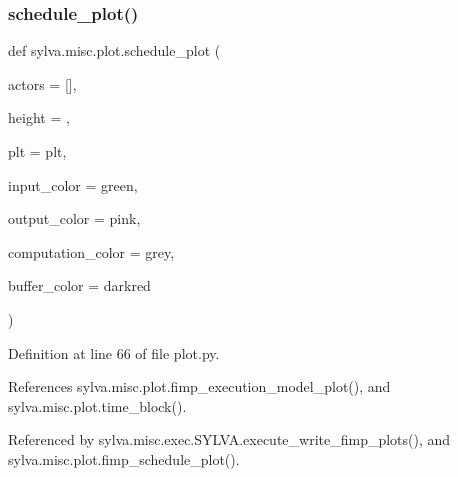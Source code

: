 \subsubsection{\texorpdfstring{schedule\+\_\+plot()}{schedule\_plot()}}
{\footnotesize\ttfamily def sylva.\+misc.\+plot.\+schedule\+\_\+plot (\begin{DoxyParamCaption}\item[{}]{actors = {\ttfamily \mbox{[}\mbox{]}},  }\item[{}]{height = {},  }\item[{}]{plt = {\ttfamily plt},  }\item[{}]{input\+\_\+color = {\ttfamily \textquotesingle{}green\textquotesingle{}},  }\item[{}]{output\+\_\+color = {\ttfamily \textquotesingle{}pink\textquotesingle{}},  }\item[{}]{computation\+\_\+color = {\ttfamily \textquotesingle{}grey\textquotesingle{}},  }\item[{}]{buffer\+\_\+color = {\ttfamily \textquotesingle{}darkred\textquotesingle{}} }\end{DoxyParamCaption})}



Definition at line 66 of file plot.\+py.



References sylva.\+misc.\+plot.\+fimp\+\_\+execution\+\_\+model\+\_\+plot(), and sylva.\+misc.\+plot.\+time\+\_\+block().



Referenced by sylva.\+misc.\+exec.\+S\+Y\+L\+V\+A.\+execute\+\_\+write\+\_\+fimp\+\_\+plots(), and sylva.\+misc.\+plot.\+fimp\+\_\+schedule\+\_\+plot().


